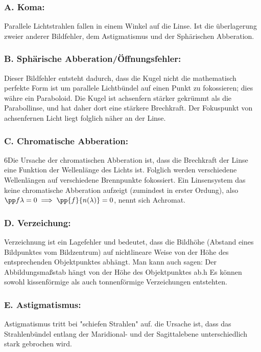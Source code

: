 \documentclass[twocolumn, unnumberedsubsub]{summery_3.1}
\begin{document}
\subsubsection*{A. Koma:}
Parallele Lichtstrahlen fallen in einem Winkel auf die Linse. Ist die überlagerung zweier anderer Bildfehler,
dem Astigmatismus und der Sphärischen Abberation.\tight

\subsubsection*{B. Sphärische Abberation/Öffnungsfehler:}
Dieser Bildfehler entsteht dadurch, dass die Kugel nicht die mathematisch perfekte Form 
ist um parallele Lichtbündel auf einen Punkt zu fokossieren; dies währe ein Paraboloid.
Die Kugel ist achsenfern stärker gekrümmt als die Parabollinse, und hat daher dort eine 
stärkere Brechkraft. Der Fokuspunkt von achsenfernen Licht liegt folglich näher an der Linse. \tight

\subsubsection*{C. Chromatische Abberation:}
6Die Ursache der chromatischen Abberation ist, dass die Brechkraft der Linse eine Funktion der Wellenlänge des 
Lichts ist. Folglich werden verschiedene Wellenlängen auf verschiedene Brennpunkte fokossiert. 
Ein Linsensystem das keine chromatische Abberation aufzeigt (zumindest in erster Ordung), 
also \(\pp f\lambda=0 \implies \pp{f}{n(\lambda)} =0\), nennt sich Achromat.\tight

\subsubsection*{D. Verzeichung:}
Verzeichnung ist ein Lagefehler und bedeutet, dass die Bildhöhe (Abstand eines Bildpunktes vom Bildzentrum)
auf nichtlineare Weise von der Höhe des entsprechenden Objektpunktes abhängt. Man kann auch sagen: Der Abbildungsmaßstab hängt von
der Höhe des Objektpunktes ab.h Es können sowohl kissenförmige als auch tonnenförmige Verzeichungen entstehten.\tight

\subsubsection*{E. Astigmatismus:}
Astigmatismus tritt bei "schiefen Strahlen"{} auf. die Ursache ist, dass das 
Strahlenbündel entlang der Maridional- und der Sagittalebene unterschiedlich stark gebrochen wird.
\end{document}
